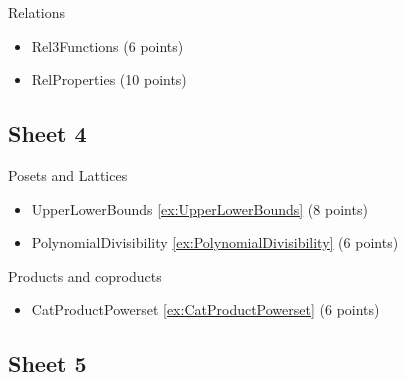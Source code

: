 Relations
\begin{itemize}
\item Rel3Functions (6 points)
\item RelProperties (10 points)
\end{itemize}



\subsection{Sheet 4}

Posets and Lattices
\begin{itemize}
\item UpperLowerBounds \cref{ex:UpperLowerBounds} (8 points)
\item PolynomialDivisibility \cref{ex:PolynomialDivisibility} (6 points)
\end{itemize}


Products and coproducts
\begin{itemize}
\item CatProductPowerset \cref{ex:CatProductPowerset} (6 points)
\end{itemize}


\subsection{Sheet 5}